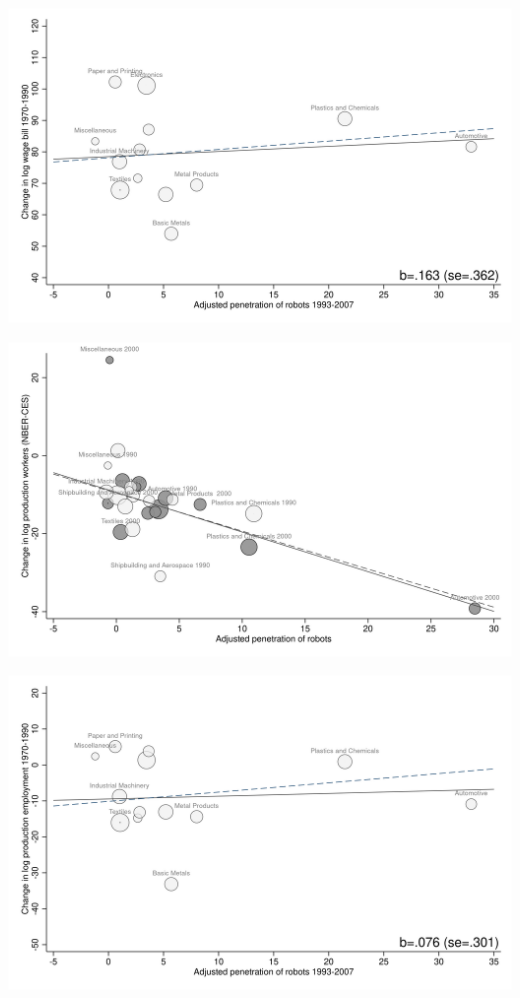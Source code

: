 \documentclass{article}
\begin{document}
\begin{center}\includegraphics[scale=0.15]{output/figure_industry_pay_placebo.png}\end{center}
\begin{center}\includegraphics[scale=0.15]{output/figure_industry_prode_nber.png}\end{center}
\begin{center}\includegraphics[scale=0.15]{output/figure_industry_prode_placebo.png}\end{center}
\end{document}

